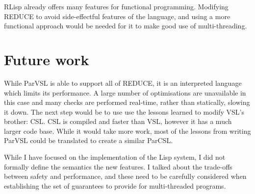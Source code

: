 RLisp already offers many features for functional programming.
Modifying REDUCE to avoid side-effectful features of the language, and using a more
functional approach would be needed for it to make good use of multi-threading.

\section{Future work}

While ParVSL is able to support all of REDUCE, it is an interpreted language
which limits its performance. A large number of optimisations are unavailable in this
case and many checks are performed real-time, rather than statically, slowing it down.
The next step would be to use use the lessons learned to modify VSL's brother: CSL.
CSL is compiled and faster than VSL, however it has a much larger code base.
While it would take more work, most of the lessons from writing ParVSL could be translated
to create a similar ParCSL.

While I have focused on the implementation of the Lisp system, I did not formally define
the semantics the new features. I talked about the trade-offs between safety and performance,
and these need to be carefully considered when establishing the set of guarantees to
provide for multi-threaded programs.

